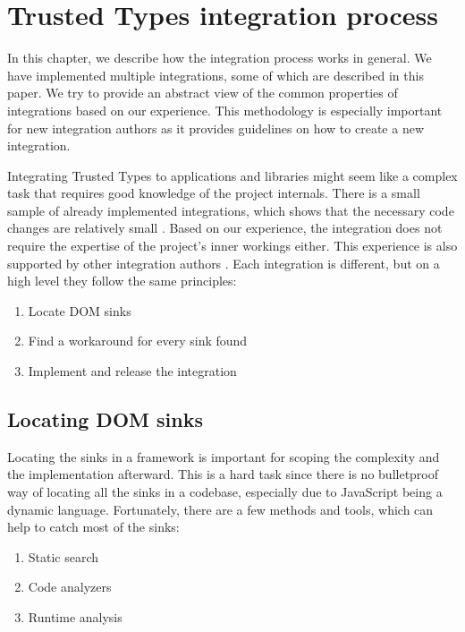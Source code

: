 \chapter{Trusted Types integration process}
\label{tt_integration_setup}

In this chapter, we describe how the integration process works in general. We have implemented
multiple integrations, some of which are described in this paper. We try to provide an abstract view
of the common properties of integrations based on our experience. This methodology is especially
important for new integration authors as it provides guidelines on how to create a new integration.

Integrating Trusted Types to applications and libraries might seem like a complex task that requires
good knowledge of the project internals. There is a small sample of already implemented
integrations, which shows that the necessary code changes are relatively small
\cite{tt_integration_list}. Based on our experience, the integration does not require the expertise
of the project's inner workings either. This experience is also supported by other integration
authors \cite{tt_web_framework_paper}. Each integration is different, but on a high level they
follow the same principles:

\begin{enumerate}
  \item Locate DOM sinks
  \item Find a workaround for every sink found
  \item Implement and release the integration
\end{enumerate}

\section{Locating DOM sinks}

Locating the sinks in a framework is important for scoping the complexity and the implementation
afterward. This is a hard task since there is no bulletproof way of locating all the sinks in a
codebase, especially due to JavaScript being a dynamic language. Fortunately, there are a few
methods and tools, which can help to catch most of the sinks:

\begin{enumerate}
  \item Static search
  \item Code analyzers
  \item Runtime analysis
\end{enumerate}


